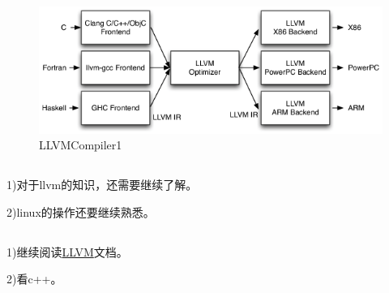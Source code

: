\begin{figure}
\centering
\includegraphics[width=6in]{img/LLVMCompiler1.png}
\caption{LLVMCompiler1}
\label{LLVMCompiler1}
\end{figure}

\subsection{}


1)对于llvm的知识，还需要继续了解。


2)linux的操作还要继续熟悉。

\subsection{}

1)继续阅读\href{http://llvm.org/}{LLVM}文档。

2)看c++。

